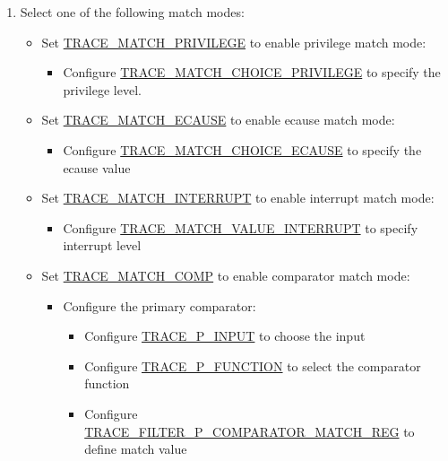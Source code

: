 \documentclass[main\_\_EN.tex]{subfiles}
\begin{document}
\begin{enumerate}
    \item Select one of the following match modes:
        \begin{itemize}
            \item Set \hyperref[fielddesc:TRACEMATCHPRIVILEGE]{TRACE\_MATCH\_PRIVILEGE} to enable privilege match mode:
                \begin{itemize}
                    \item Configure \hyperref[fielddesc:TRACEMATCHCHOICEPRIVILEGE]{TRACE\_MATCH\_CHOICE\_PRIVILEGE} to specify the privilege level.
                \end{itemize}
            \item Set \hyperref[fielddesc:TRACEMATCHECAUSE]{TRACE\_MATCH\_ECAUSE} to enable ecause match mode:
                \begin{itemize}
                    \item Configure \hyperref[fielddesc:TRACEMATCHCHOICEECAUSE]{TRACE\_MATCH\_CHOICE\_ECAUSE} to specify the ecause value
                \end{itemize}
            \item Set \hyperref[fielddesc:TRACEMATCHINTERRUPT]{TRACE\_MATCH\_INTERRUPT} to enable interrupt match mode:
                \begin{itemize}
                    \item Configure \hyperref[fielddesc:TRACEMATCHVALUEINTERRUPT]{TRACE\_MATCH\_VALUE\_INTERRUPT} to specify interrupt level
                \end{itemize}
            \item Set \hyperref[fielddesc:TRACEMATCHCOMP]{TRACE\_MATCH\_COMP} to enable comparator match mode:
                \begin{itemize}
                    \item Configure the primary comparator:
                        \begin{itemize}
                            \item Configure \hyperref[fielddesc:TRACEPINPUT]{TRACE\_P\_INPUT} to choose the input
                            \item Configure \hyperref[fielddesc:TRACEPFUNCTION]{TRACE\_P\_FUNCTION} to select the comparator function
                            \item Configure \hyperref[regdesc:TRACEFILTERPCOMPARATORMATCHREG]{TRACE\_FILTER\_P\_COMPARATOR\_MATCH\_REG} to define match value
                        \end{itemize}

\end{itemize}
\end{itemize}
\end{enumerate}
\end{document}
